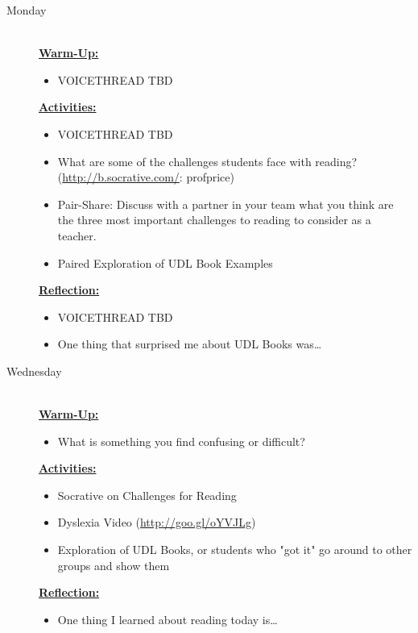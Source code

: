 \documentclass{tufte-handout}
\newcommand{\listmon}{\item[Monday] \hfill \\}
\newcommand{\listwed}{\item[Wednesday] \hfill \\}
\newenvironment{daywu}
	{\textbf{\underline{Warm-Up:}} \hfill \\
	\begin{itemize}}
	{\end{itemize}}
\newenvironment{dayact}
	{\textbf{\underline{Activities:}} \hfill \\
	\begin{itemize}}
	{\end{itemize}}
\newenvironment{dayref}
	{\textbf{\underline{Reflection:}} \hfill \\
	\begin{itemize}}
	{\end{itemize}}
\newenvironment{weeksched}
	{\noindent
	\begin{description}}
	{\end{description}
	\newpage}
\begin{document}
\begin{fullwidth}
\begin{weeksched}
\listmon
	\begin{daywu}
		\item VOICETHREAD TBD
	\end{daywu}
	\begin{dayact}
		\item VOICETHREAD TBD
		\item What are some of the challenges students face with reading? (\url{http://b.socrative.com/}: profprice)
		\item Pair-Share: Discuss with a partner in your team what you think are the three most important challenges to reading to consider as a teacher.
		\item Paired Exploration of UDL Book Examples
	\end{dayact}
	\begin{dayref}
		\item VOICETHREAD TBD
		\item One thing that surprised me about UDL Books was\ldots
	\end{dayref}

\listwed
	\begin{daywu}
		\item What is something you find confusing or difficult?
	\end{daywu}
	\begin{dayact}
		\item Socrative on Challenges for Reading
		\item Dyslexia Video (\url{http://goo.gl/oYVJLg})
		\item Exploration of UDL Books, or students who "got it" go around to other groups and show them
	\end{dayact}
	\begin{dayref}
		\item One thing I learned about reading today is\ldots
	\end{dayref}


\end{weeksched}
\end{fullwidth}
\end{document}
